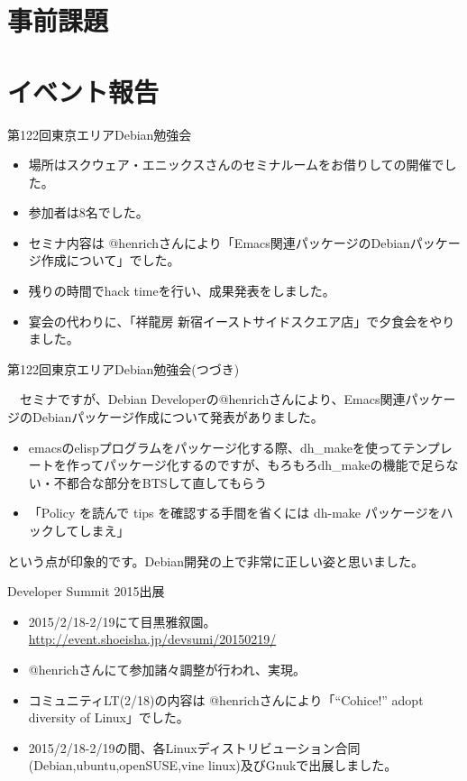\section{事前課題}
{\footnotesize

}

\section{イベント報告}


\begin{frame}{第122回東京エリアDebian勉強会}

\begin{itemize}
\item 場所はスクウェア・エニックスさんのセミナルームをお借りしての開催でした。
\item 参加者は8名でした。
\item セミナ内容は @henrichさんにより「Emacs関連パッケージのDebianパッケージ作成について」でした。
\item 残りの時間でhack timeを行い、成果発表をしました。
\item 宴会の代わりに、「祥龍房 新宿イーストサイドスクエア店」で夕食会をやりました。
\end{itemize} 
  
\end{frame}

\begin{frame}{第122回東京エリアDebian勉強会(つづき)}

　セミナですが、Debian Developerの@henrichさんにより、Emacs関連パッケージのDebianパッケージ作成について発表がありました。

 \begin{itemize}
   \item emacsのelispプログラムをパッケージ化する際、dh\_makeを使ってテンプレートを作ってパッケージ化するのですが、もろもろdh\_makeの機能で足らない・不都合な部分をBTSして直してもらう
   \item 「Policy を読んで tips を確認する手間を省くには dh-make パッケージをハックしてしまえ」
 \end{itemize}

という点が印象的です。Debian開発の上で非常に正しい姿と思いました。
  
\end{frame}

\begin{frame}{Developer Summit 2015出展}

\begin{itemize}
\item 2015/2/18-2/19にて目黒雅叙園。\url{http://event.shoeisha.jp/devsumi/20150219/}
\item @henrichさんにて参加諸々調整が行われ、実現。
\item コミュニティLT(2/18)の内容は @henrichさんにより「``Cohice!'' adopt diversity of Linux」でした。
\item 2015/2/18-2/19の間、各Linuxディストリビューション合同(Debian,ubuntu,openSUSE,vine linux)及びGnukで出展しました。
\end{itemize} 

\end{frame}

